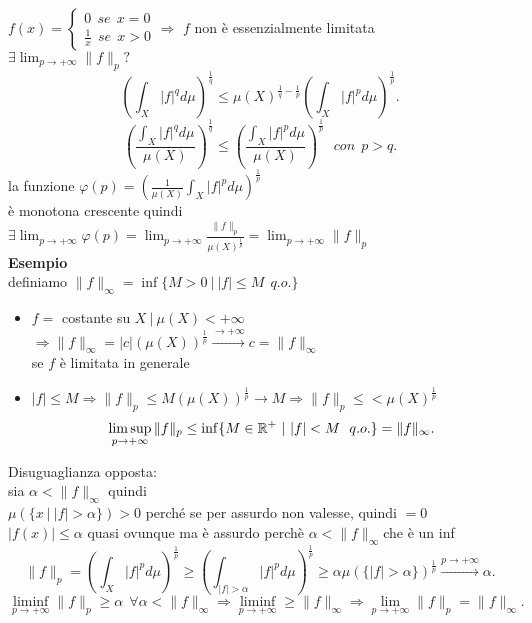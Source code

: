\documentclass[12px]{article}
\begin{document}
	 $f(x) = \begin{cases}
	 	0 \ \ se \ \ x = 0\\
		\frac 1 x\ \ se \ \ x  >0
	 \end{cases} \Rightarrow $ $f$ non è essenzialmente limitata\\
	 $\exists \lim_{p \rightarrow+\infty}\|f\|_p?$
	 \[
		 \left(\int_X|f|^qd\mu \right)^{\frac 1q} \leq \mu(X)^{\frac 1q - \frac 1p} \left(\int_X |f|^pd\mu \right)^{\frac 1p}
	 .\] 
	 \[
		 \left(\frac{\int_X|f|^qd\mu}{\mu(X)} \right)^{\frac 1q}\leq \left(\frac{\int_X|f|^pd\mu}{\mu(X)} \right)^{\frac 1p}\ \ \ con \ \ p> q
	 .\] 
	 la funzione $ \varphi(p) = \left(\frac {1}{\mu(X)} \int_X|f|^pd\mu \right)^{\frac 1p}$\\
	 è monotona crescente quindi $\displaystyle\exists \lim_{p \rightarrow +\infty} \varphi(p) = \lim_{p \rightarrow +\infty} \frac{\|f\|_p}{\mu(X)^{\frac 1p}} = \lim_{p \rightarrow +\infty}\|f\|_p$\\
	 \textbf{Esempio}\\
	 definiamo $\|f\|_{\infty} = \inf\{M > 0 \ | \ |f|\leq M \ \ q.o.\}$
	 \begin{itemize}
		 \item $f = $ costante su  $X\ | \ \mu(X) < +\infty$ \\
			 $ \Rightarrow  \|f\|_\infty = |c| \left(\mu(X) \right)^{\frac 1 p} \xrightarrow{ \rightarrow +\infty} c = \|f\|_\infty$\\
			 se $f$ è limitata in generale
		 \item $|f|\leq M \Rightarrow  \|f\|_p \leq M(\mu(X) )^{\frac 1p} \rightarrow M \Rightarrow  \|f\|_p \leq <\mu(X)^{\frac 1p}$ 
			 \[
				 \limsup_{p \rightarrow +\infty}\|f\|_p \leq \inf\{M\in \mathbb{R}^+\ | \ |f| < M \ \ q.o.\} =\|f\|_\infty
			 .\] 
	 \end{itemize}
Disuguaglianza opposta:\\
sia $\alpha < \|f\|_\infty$ quindi \\
$\mu(\{x\ |\ |f| > \alpha\} ) > 0 $ perché se per assurdo non valesse, quindi  $=0$\\
 $|f(x)| \leq \alpha$ quasi ovunque ma è assurdo perchè  $\alpha < \|f\|_\infty$che è un inf
  \[
	  \|f\|_p = \left(\int_X |f|^pd\mu \right)^{\frac 1p}\geq \left(\int_{|f|>\alpha}|f|^pd\mu \right)^{\frac 1p} \geq \alpha \mu(\{|f|> \alpha\})^{\frac 1p} \xrightarrow
  { p \rightarrow+\infty}\alpha.\] 
  \[
	  \liminf_{p \rightarrow+\infty} \|f\|_p \geq \alpha \ \ \forall \alpha < \|f\|_\infty \Rightarrow  \liminf_{p \rightarrow +\infty}\geq \|f\|_\infty \Rightarrow  \lim_{ p \rightarrow +\infty}\|f\|_p = \|f\|_\infty
  .\] 
\end{document}

